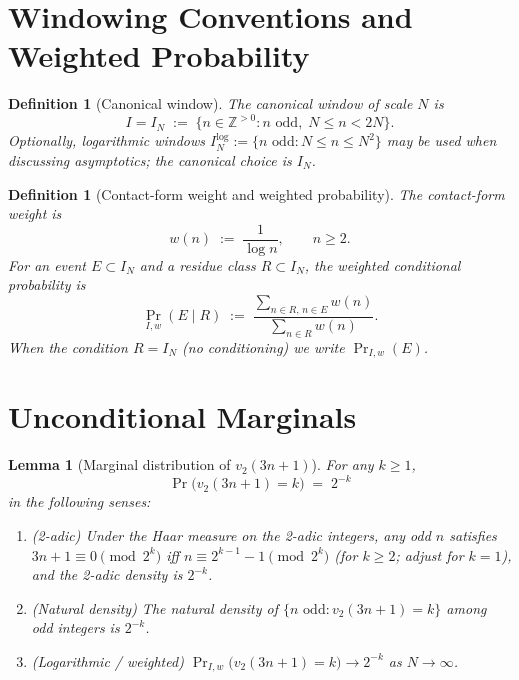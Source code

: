 \documentclass[11pt,a4paper]{article}
\newcommand{\vt}[1]{v_2\!\left(#1\right)}          %
\newcommand{\wn}{w(n)}                              %
\newcommand{\PrIw}{\Pr_{I,w}}                       %
\newtheorem{lemma}[theorem]{Lemma}
\newtheorem{definition}[theorem]{Definition}
\begin{document}
\section{Windowing Conventions and Weighted Probability}

\begin{definition}[Canonical window]\label{def:window}
The \emph{canonical window} of scale $N$ is
\[
  I = I_N \;:=\; \{n \in \mathbb{Z}^{>0} : n \text{ odd},\; N \le n < 2N\}.
\]
Optionally, \emph{logarithmic windows} $I^{\log}_N := \{n \text{ odd} : N \le n \le N^2\}$
may be used when discussing asymptotics; the canonical choice is $I_N$.
\end{definition}

\begin{definition}[Contact-form weight and weighted probability]\label{def:weight}
The \emph{contact-form weight} is
\[
  \wn \;:=\; \frac{1}{\log n}, \qquad n \ge 2.
\]
For an event $E \subset I_N$ and a residue class $R \subset I_N$, the
\emph{weighted conditional probability} is
\[
  \PrIw(E \mid R) \;:=\;
  \frac{\displaystyle\sum_{n \in R,\, n \in E} w(n)}
       {\displaystyle\sum_{n \in R} w(n)}.
\]
When the condition $R = I_N$ (no conditioning) we write $\PrIw(E)$.
\end{definition}

\section{Unconditional Marginals}

\begin{lemma}[Marginal distribution of $\vt{3n+1}$]\label{lem:marginal}
For any $k \ge 1$,
\[
  \Pr\!\bigl(\vt{3n+1} = k\bigr) \;=\; 2^{-k}
\]
in the following senses:
\begin{enumerate}
  \item \emph{(2-adic)} Under the Haar measure on the 2-adic integers, any odd $n$
        satisfies $3n+1 \equiv 0 \pmod{2^k}$ iff $n \equiv 2^{k-1} - 1 \pmod{2^k}$
        (for $k \ge 2$; adjust for $k=1$), and the 2-adic density is $2^{-k}$.
  \item \emph{(Natural density)} The natural density of $\{n \text{ odd} : \vt{3n+1}=k\}$
        among odd integers is $2^{-k}$.
  \item \emph{(Logarithmic / weighted)} $\PrIw\!\bigl(\vt{3n+1}=k\bigr) \to 2^{-k}$
        as $N \to \infty$.
\end{enumerate}
\end{lemma}
\end{document}
